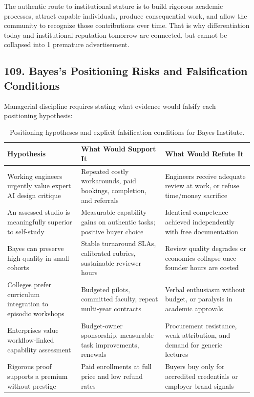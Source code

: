 The authentic route to institutional stature is to build rigorous academic processes, attract capable individuals, produce consequential work, and allow the community to recognize those contributions over time. That is why differentiation today and institutional reputation tomorrow are connected, but cannot be collapsed into 1 premature advertisement.

\subsection*{109. Bayes's Positioning Risks and Falsification Conditions}

Managerial discipline requires stating what evidence would falsify each positioning hypothesis:

\begin{table}[t]
\centering
\small
\begin{tabularx}{\textwidth}{>{\raggedright\arraybackslash}p{4cm} >{\raggedright\arraybackslash}X >{\raggedright\arraybackslash}X}
\toprule
\textbf{Hypothesis} & \textbf{What Would Support It} & \textbf{What Would Refute It} \\
\midrule
Working engineers urgently value expert AI design critique & Repeated costly workarounds, paid bookings, completion, and referrals & Engineers receive adequate review at work, or refuse time/money sacrifice \\
An assessed studio is meaningfully superior to self-study & Measurable capability gains on authentic tasks; positive buyer choice & Identical competence achieved independently with free documentation \\
Bayes can preserve high quality in small cohorts & Stable turnaround SLAs, calibrated rubrics, sustainable reviewer hours & Review quality degrades or economics collapse once founder hours are costed \\
Colleges prefer curriculum integration to episodic workshops & Budgeted pilots, committed faculty, repeat multi-year contracts & Verbal enthusiasm without budget, or paralysis in academic approvals \\
Enterprises value workflow-linked capability assessment & Budget-owner sponsorship, measurable task improvements, renewals & Procurement resistance, weak attribution, and demand for generic lectures \\
Rigorous proof supports a premium without prestige & Paid enrollments at full price and low refund rates & Buyers buy only for accredited credentials or employer brand signals \\
\bottomrule
\end{tabularx}
\caption{Positioning hypotheses and explicit falsification conditions for Bayes Institute.}
\label{tab:ch8-falsification-conditions}
\end{table}

